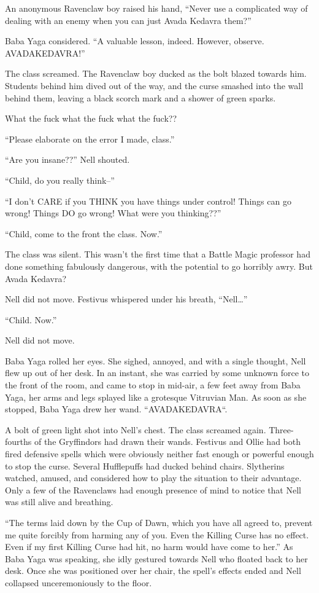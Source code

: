 An anonymous Ravenclaw boy raised his hand, “Never use a complicated way of dealing with an enemy when you can just Avada Kedavra them?”

Baba Yaga considered. “A valuable lesson, indeed. However, observe. AVADAKEDAVRA!”

The class screamed. The Ravenclaw boy ducked as the bolt blazed towards him. Students behind him dived out of the way, and the curse smashed into the wall behind them, leaving a black scorch mark and a shower of green sparks.

What the fuck what the fuck what the fuck??

“Please elaborate on the error I made, class.”

“Are you insane??” Nell shouted.

“Child, do you really think–”

“I don’t CARE if you THINK you have things under control! Things can go wrong! Things DO go wrong! What were you thinking??”

“Child, come to the front the class. Now.”

The class was silent. This wasn’t the first time that a Battle Magic professor had done something fabulously dangerous, with the potential to go horribly awry. But Avada Kedavra?

Nell did not move. Festivus whispered under his breath, “Nell…”

“Child. Now.”

Nell did not move.

Baba Yaga rolled her eyes. She sighed, annoyed, and with a single thought, Nell flew up out of her desk. In an instant, she was carried by some unknown force to the front of the room, and came to stop in mid-air, a few feet away from Baba Yaga, her arms and legs splayed like a grotesque Vitruvian Man. As soon as she stopped, Baba Yaga drew her wand. “AVADAKEDAVRA“.

A bolt of green light shot into Nell’s chest. The class screamed again. Three-fourths of the Gryffindors had drawn their wands. Festivus and Ollie had both fired defensive spells which were obviously neither fast enough or powerful enough to stop the curse. Several Hufflepuffs had ducked behind chairs. Slytherins watched, amused, and considered how to play the situation to their advantage. Only a few of the Ravenclaws had enough presence of mind to notice that Nell was still alive and breathing.

“The terms laid down by the Cup of Dawn, which you have all agreed to, prevent me quite forcibly from harming any of you. Even the Killing Curse has no effect. Even if my first Killing Curse had hit, no harm would have come to her.” As Baba Yaga was speaking, she idly gestured towards Nell who floated back to her desk. Once she was positioned over her chair, the spell’s effects ended and Nell collapsed unceremoniously to the floor.

